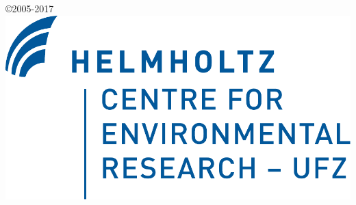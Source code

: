 \documentclass{book}
\begin{document}
\begin{titlepage}
\begin{center}
{\large \copyright 2005-2017}\\
\vspace*{0.75cm}
\includegraphics[totalheight=1.75cm]{figures/ufz_logo.pdf}\\

\end{center}
\end{titlepage}
\clearemptydoublepage
{}
\tableofcontents
\clearemptydoublepage
{}
\hypersetup{pageanchor=true,citecolor=blue}
\end{document}
